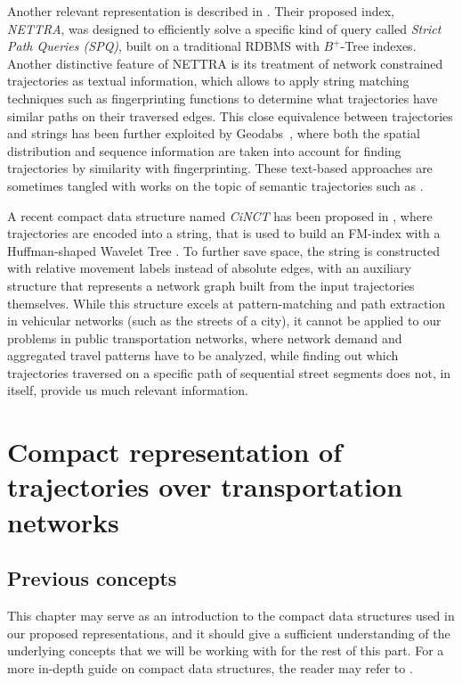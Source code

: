 \documentclass[a4paper,10pt,twoside]{book}
\begin{document}
    Another relevant representation is described in \cite{DBLP:conf/gis/KroghPTT14}. Their proposed index, {\em NETTRA}, was designed to efficiently solve a specific kind of query called {\em Strict Path Queries (SPQ)}, built on a traditional RDBMS with $B^+$-Tree indexes. Another distinctive feature of NETTRA is its treatment of network constrained trajectories as textual information, which allows to apply string matching techniques such as fingerprinting functions to determine what trajectories have similar paths on their traversed edges. This close equivalence between trajectories and strings has been further exploited by Geodabs~\cite{chapuis2018geodabs}, where both the spatial distribution and sequence information are taken into account for finding trajectories by similarity with fingerprinting. These text-based approaches are sometimes tangled with works on the topic of semantic trajectories such as \cite{al2017semantictraj}.
    
    
    A recent compact data structure named {\em CiNCT} has been proposed in \cite{koide2018cinct}, where trajectories are encoded into a string, that is used to build an FM-index \cite{DBLP:conf/focs/FerraginaM00} with a Huffman-shaped Wavelet Tree \cite{ferragina2009compressed}. To further save space, the string is constructed with relative movement labels instead of absolute edges, with an auxiliary structure that represents a network graph built from the input trajectories themselves. While this structure excels at pattern-matching and path extraction in vehicular networks (such as the streets of a city), it cannot be applied to our problems in public transportation networks, where network demand and aggregated travel patterns have to be analyzed, while finding out which trajectories traversed on a specific path of sequential street segments does not, in itself, provide us much relevant information.
	
	
\part{Compact representation of trajectories over transportation networks}
\chapter{Previous concepts}
	This chapter may serve as an introduction to the compact data structures used in our proposed representations, and it should give a sufficient understanding of the underlying concepts that we will be working with for the rest of this part. For a more in-depth guide on compact data structures, the reader may refer to \cite{Nav16}.
	
\end{document}
